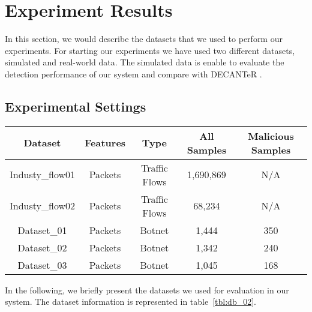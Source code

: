 \section{Experiment Results}

In this section, we would describe the datasets that we used to perform our experiments. For starting our experiments we have used two different datasets, simulated and real-world data. The simulated data is enable to evaluate the detection performance of our system and compare with DECANTeR \cite{bortolameotti2017decanter}.


\subsection{Experimental Settings}

\begin{table*}[!h]
\centering
\caption{Overview of the Datasets. We collect five datasets which industry series sets were real-world flows and the remaining of three were simulated data. Since the real-world traffic cannot be properly labeled, we treat real-world data as benign traffic. These data are captured by tcpdump and then using the scapy module to extract the HTTP header information we need.}
\label{tbl:db_02}
\begin{tabular}{|c|c|c|c|c|}
\hline\hline
Dataset         & Features & Type            & All Samples & Malicious Samples \\ \hline
Industy\_flow01 & Packets  & Traffic Flows & 1,690,869     & N/A               \\ \hline
Industy\_flow02 & Packets  & Traffic Flows & 68,234       & N/A               \\ \hline
Dataset\_01     & Packets  & Botnet          & 1,444         & 350               \\ \hline
Dataset\_02     & Packets  & Botnet          & 1,342         & 240               \\ \hline
Dataset\_03     & Packets  & Botnet          & 1,045         & 168               \\ \hline\hline
\end{tabular}
\end{table*}


In the following, we briefly present the datasets we used for evaluation in our system. The dataset information is represented in table~\ref{tbl:db_02}.

